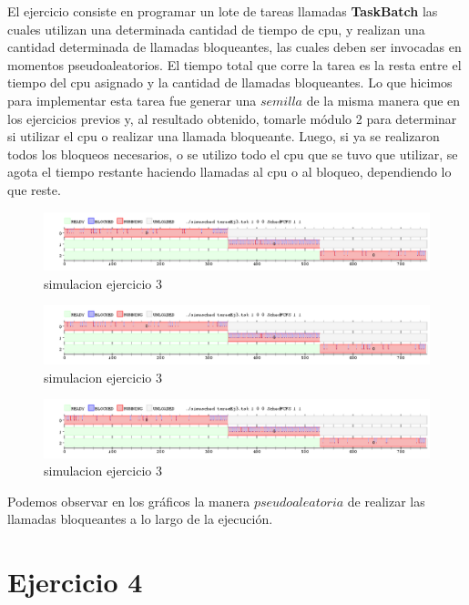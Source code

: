 \documentclass[11pt]{article}
\begin{document}
  El ejercicio consiste en programar un lote de tareas llamadas \textbf{TaskBatch} las cuales utilizan una determinada cantidad de tiempo de cpu, y 
  realizan una cantidad determinada de llamadas bloqueantes, las cuales deben ser invocadas en momentos pseudoaleatorios. El tiempo total que corre 
  la tarea es la resta entre el tiempo del cpu asignado y la cantidad de llamadas bloqueantes. Lo que hicimos para implementar esta tarea fue generar 
  una $semilla$ de la misma manera que en los ejercicios previos y, al resultado obtenido, tomarle módulo 2 para determinar si utilizar el cpu o 
  realizar una llamada bloqueante. Luego, si ya se realizaron todos los bloqueos necesarios, o se utilizo todo el cpu que se tuvo que utilizar, se 
  agota el tiempo restante haciendo llamadas al cpu o al bloqueo, dependiendo lo que reste.

    \begin{figure}[H]
      \includegraphics[scale=0.5]{Ejercicio3_1}
      \caption{simulacion ejercicio 3}
    \end{figure}

    \begin{figure}[H]
      \includegraphics[scale=0.5]{Ejercicio3_2}
      \caption{simulacion ejercicio 3}
    \end{figure}

    \begin{figure}[H]
      \includegraphics[scale=0.5]{Ejercicio3_3}
      \caption{simulacion ejercicio 3}
    \end{figure}

  Podemos observar en los gráficos la manera $pseudoaleatoria$ de realizar las llamadas bloqueantes a lo largo de la ejecución.

  \newpage 


  \section{Ejercicio 4}
\end{document}
